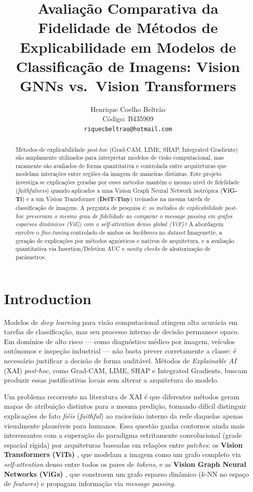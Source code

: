 \documentclass{article}
\title{Avaliação Comparativa da Fidelidade de Métodos de Explicabilidade em Modelos de Classificação de Imagens: Vision GNNs vs.\ Vision Transformers}
\author{%
  Henrique Coelho Beltrão \\
  Código: B435909 \\
  \texttt{riquecbeltrao@hotmail.com} \\
}
\begin{document}
\maketitle

\begin{abstract}
Métodos de explicabilidade \textit{post-hoc} (Grad-CAM, LIME, SHAP, Integrated Gradients) são amplamente utilizados para interpretar modelos de visão computacional, mas raramente são avaliados de forma quantitativa e controlada entre arquiteturas que modelam interações entre regiões da imagem de maneiras distintas. Este projeto investiga se explicações geradas por esses métodos mantêm o mesmo nível de fidelidade (\textit{faithfulness}) quando aplicados a uma Vision Graph Neural Network isotrópica (\textbf{ViG-Ti}) e a um Vision Transformer (\textbf{DeiT-Tiny}) treinados na mesma tarefa de classificação de imagens. A pergunta de pesquisa é: \textit{os métodos de explicabilidade post-hoc preservam o mesmo grau de fidelidade ao comparar o message passing em grafos esparsos dinâmicos (ViG) com o self-attention denso global (ViT)?} A abordagem envolve o \textit{fine-tuning} controlado de ambos os \textit{backbones} no \textit{dataset} Imagenette, a geração de explicações por métodos agnósticos e nativos de arquitetura, e a avaliação quantitativa via Insertion/Deletion AUC e \textit{sanity checks} de aleatorização de parâmetros.
\end{abstract}

\section{Introduction}
\label{sec:intro}

Modelos de \textit{deep learning} para visão computacional atingem alta acurácia em tarefas de classificação, mas seu processo interno de decisão permanece opaco. Em domínios de alto risco --- como diagnóstico médico por imagem, veículos autônomos e inspeção industrial --- não basta prever corretamente a classe: é necessário justificar a decisão de forma auditável. Métodos de \textit{Explainable AI} (XAI) \textit{post-hoc}, como Grad-CAM, LIME, SHAP e Integrated Gradients, buscam produzir essas justificativas locais sem alterar a arquitetura do modelo.

Um problema recorrente na literatura de XAI é que diferentes métodos geram mapas de atribuição distintos para a mesma predição, tornando difícil distinguir explicações de fato \textit{fiéis} (\textit{faithful}) ao raciocínio interno da rede daquelas apenas visualmente plausíveis para humanos. Essa questão ganha contornos ainda mais interessantes com a superação do paradigma estritamente convolucional (grade espacial rígida) por arquiteturas baseadas em relações entre \textit{patches}: os \textbf{Vision Transformers (ViTs)} \citep{dosovitskiy2021vit,touvron2021deit}, que modelam a imagem como um grafo completo via \textit{self-attention} denso entre todos os pares de \textit{tokens}, e as \textbf{Vision Graph Neural Networks (ViGs)} \citep{han2022vig}, que constroem um grafo esparso dinâmico ($k$-NN no espaço de \textit{features}) e propagam informação via \textit{message passing}.
\end{document}
